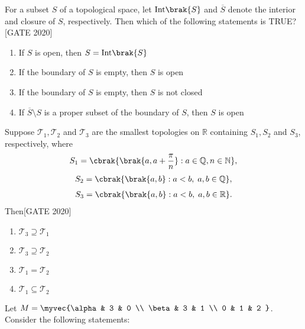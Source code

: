     \item  For a subset $S$ of a topological space, let $\text{Int}\brak{S}$ and $\overline{S}$ denote the interior and closure of $S$, respectively. Then which of the following statements is TRUE?
    \hfill{[GATE 2020]}
      \begin{enumerate}
            \item If $S$ is open, then $S = \text{Int}\brak{S}$
            \item If the boundary of $S$ is empty, then $S$ is open
            \item If the boundary of $S$ is empty, then $S$ is not closed
            \item If $\overline{S} \setminus S$ is a proper subset of the boundary of $S$, then $S$ is open
        \end{enumerate}
    
    \item  Suppose $\mathcal{T}_1, \mathcal{T}_2$ and $\mathcal{T}_3$ are the smallest topologies on $\mathbb{R}$ containing $S_1, S_2$ and $S_3$, respectively, where
    \begin{align*}
    S_1 = \cbrak{ \brak{ a, a + \dfrac{\pi}{n} } : a \in \mathbb{Q}, n \in \mathbb{N} },
    \end{align*}
    \begin{align*}
    S_2 = \cbrak{ \brak{a, b} : a < b, \; a, b \in \mathbb{Q} },
    \end{align*}
    \begin{align*}
    S_3 = \cbrak{ \brak{a, b} : a < b, \; a, b \in \mathbb{R} }.
    \end{align*}
    Then\hfill{[GATE 2020]}

        \begin{multicols}{2}\begin{enumerate}
            \item $\mathcal{T}_3 \supseteq \mathcal{T}_1$
            \item $\mathcal{T}_3 \supseteq \mathcal{T}_2$
            \item $\mathcal{T}_1 = \mathcal{T}_2$
            \item $\mathcal{T}_1 \subseteq \mathcal{T}_2$
        \end{enumerate}
        \end{multicols}
  

  
  
   \item     Let $ M = \myvec{\alpha & 3 & 0 \\ \beta & 3 & 1 \\ 0 & 1 & 2 } $. Consider the following statements:
    
